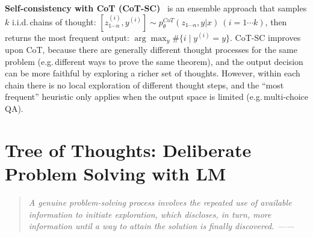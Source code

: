 \documentclass{article}
\begin{document}
\textbf{Self-consistency with CoT (CoT-SC)}~\citep{wang2022self} is an ensemble approach that samples $k$ i.i.d.\,chains of thought: $[z^{(i)}_{1\cdots n}, y^{(i)}] \sim p_\theta^{CoT}(z_{1\cdots n}, y | x) \ (i=1 \cdots k)$, then returns the most frequent output: $\arg \max_{y} \#\{i \mid y^{(i)}=y\}$. CoT-SC improves upon CoT, because there are generally different thought processes for the same problem (e.g.\,different ways to prove the same theorem), and the output decision can be more faithful by exploring a richer set of thoughts. However, within each chain there is no local exploration of different thought steps, and the ``most frequent'' heuristic only applies when the output space is limited (e.g.\,multi-choice QA).



\section{Tree of Thoughts: Deliberate Problem Solving with LM}
\begin{quote}
    \em{{A genuine problem-solving process} involves the repeated use of available information to initiate {exploration}, which discloses, in turn, more information until a way to attain the solution is finally discovered.}%
    ------ \citet{newell1959report}
    \vspace{-5pt}
\end{quote}
\end{document}
